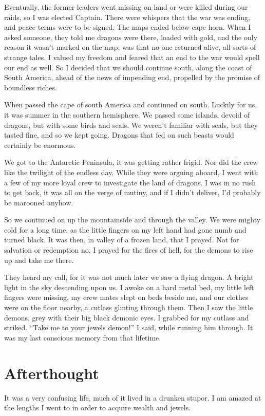Eventually, the former leaders went missing on land or were killed during our raids, so I was elected Captain.  There were whispers that the war was ending, and peace terms were to be signed. The maps ended below cape horn. When I asked someone, they told me dragons were there, loaded with gold, and the only reason it wasn’t marked on the map, was that no one returned alive, all sorts of strange tales.  I valued my freedom and feared that an end to the war would spell our end as well. So I decided that we should continue south, along the coast of South America, ahead of the news of impending end, propelled by the promise of boundless riches.

When passed the cape of south America and continued on south. Luckily for us, it was summer in the southern hemisphere. We passed some islands, devoid of dragons, but with some birds and seals.  We weren’t familiar with seals, but they tasted fine, and so we kept going.   Dragons that fed on such beasts would certainly be enormous.

We got to the Antarctic Peninsula, it was getting rather frigid. Nor did the crew like the twilight of the endless day.  While they were arguing aboard, I went with a few of my more loyal crew to investigate the land of dragons.  I was in no rush to get back, it was all on the verge of mutiny, and if I didn’t deliver, I’d probably be marooned anyhow.


So we continued on up the mountainside and through the valley.  We were mighty cold for a long time, as the little fingers on my left hand had gone numb and turned black.  It was then,  in valley of a frozen land, that I prayed. Not for salvation or redemption no, I prayed for the fires of hell,  for the demons to rise up and take me there.

They heard my call, for it was not much later we saw a flying dragon. A bright
light in the sky descending upon us. I awoke on a hard metal bed, my little left
fingers were missing, my crew mates slept on beds beside me, and our clothes
were on the floor nearby, a cutlass glinting through them. Then I saw the little
demons, grey with their big black demonic eyes.  I grabbed for my cutlass and
striked. “Take me to your jewels demon!” I said, while running him through.  It was my last conscious memory from that lifetime.

\section{Afterthought}
It was a very confusing life, much of it lived in a drunken stupor. 
I am amazed at the lengths I went to in order to acquire wealth and jewels.


